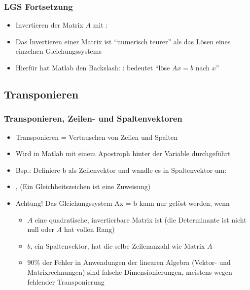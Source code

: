     \begin{frame}
        \frametitle{LGS Fortsetzung}
        \begin{itemize}
            \item Invertieren der Matrix $A$ mit : 
            \item Das Invertieren einer Matrix ist ``numerisch teurer'' als das Lösen eines einzelnen Gleichungssystems
            \item Hierfür hat Matlab den Backslash: : bedeutet ``löse $Ax = b$ nach $x$''
        \end{itemize}
    \end{frame}

    \subsection{Transponieren}
    \begin{frame}
        \frametitle{Transponieren, Zeilen- und Spaltenvektoren}
        \begin{itemize}
            \item Transponieren = Vertauschen von Zeilen und Spalten
            \item Wird in Matlab mit einem Apostroph hinter der Variable durchgeführt
            \item Bsp.: Definiere b als Zeilenvektor und wandle es in Spaltenvektor um:
            \item {}, (Ein Gleichheitszeichen ist eine Zuweisung)
            \item \alert{Achtung!} Das Gleichungssystem Ax = b kann nur gelöst werden, wenn
            \begin{itemize}
                \item $A$ eine quadratische, invertierbare Matrix ist (die Determinante ist nicht null oder $A$ hat vollen Rang)
                \item $b$, ein Spaltenvektor, hat die selbe Zeilenanzahl wie Matrix $A$
                \item 90\% der Fehler in Anwendungen der linearen Algebra (Vektor- und Matrixrechnungen) sind falsche Dimensionierungen,
                meistens wegen fehlender Transponierung
            \end{itemize}
        \end{itemize}
    \end{frame}

